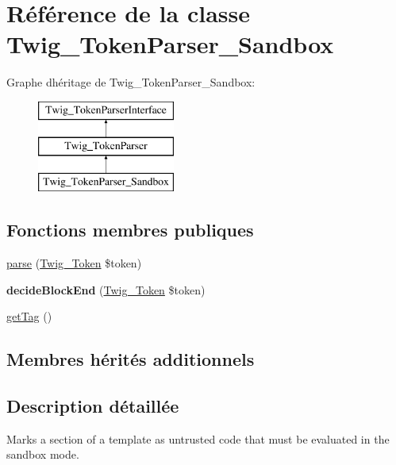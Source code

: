 \hypertarget{class_twig___token_parser___sandbox}{}\section{Référence de la classe Twig\+\_\+\+Token\+Parser\+\_\+\+Sandbox}
\label{class_twig___token_parser___sandbox}
Graphe d\textquotesingle{}héritage de Twig\+\_\+\+Token\+Parser\+\_\+\+Sandbox\+:\begin{figure}[H]
\begin{center}
\leavevmode
\includegraphics[height=3.000000cm]{class_twig___token_parser___sandbox}
\end{center}
\end{figure}
\subsection*{Fonctions membres publiques}
\begin{DoxyCompactItemize}
\item 
\hyperlink{class_twig___token_parser___sandbox_a5dfa2e269321584fb74e8b43dabe0efd}{parse} (\hyperlink{class_twig___token}{Twig\+\_\+\+Token} \$token)
\item 
{\bfseries decide\+Block\+End} (\hyperlink{class_twig___token}{Twig\+\_\+\+Token} \$token)\hypertarget{class_twig___token_parser___sandbox_aa976dc013d35c2813752149bacd88902}{}\label{class_twig___token_parser___sandbox_aa976dc013d35c2813752149bacd88902}

\item 
\hyperlink{class_twig___token_parser___sandbox_ab86ba36154b20e6bbfa3ba705f12f9d6}{get\+Tag} ()
\end{DoxyCompactItemize}
\subsection*{Membres hérités additionnels}


\subsection{Description détaillée}
Marks a section of a template as untrusted code that must be evaluated in the sandbox mode.


